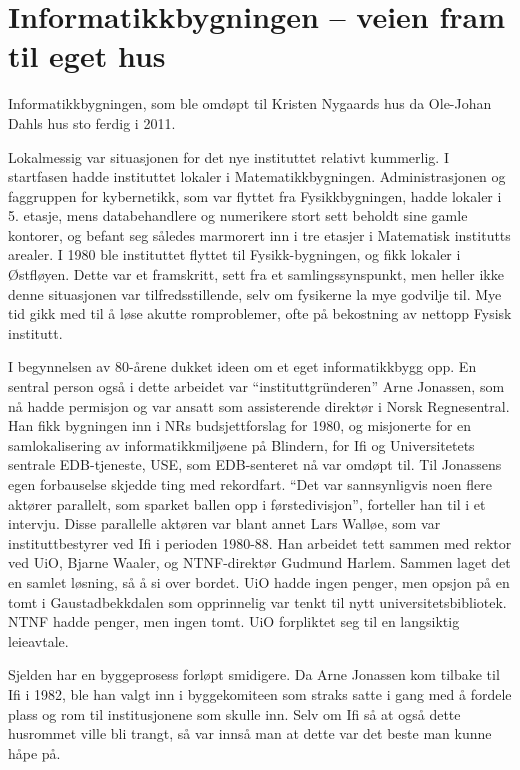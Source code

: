 \documentclass[../../main.tex]{subfiles}
\begin{document}
\chapter[Ifi 1]{Informatikkbygningen – veien fram til eget hus}


Informatikkbygningen, som ble omdøpt til Kristen Nygaards hus da Ole-Johan Dahls hus sto ferdig i 2011.

Lokalmessig var situasjonen for det nye instituttet relativt kummerlig. I startfasen hadde instituttet lokaler i Matematikkbygningen. Administrasjonen og faggruppen for kybernetikk, som var flyttet fra Fysikkbygningen, hadde lokaler i 5. etasje, mens databehandlere og numerikere stort sett beholdt sine gamle kontorer, og befant seg således marmorert inn i tre etasjer i Matematisk institutts arealer. I 1980 ble instituttet flyttet til Fysikk-bygningen, og fikk lokaler i Østfløyen. Dette var et framskritt, sett fra et samlingssynspunkt, men heller ikke denne situasjonen var tilfredsstillende, selv om fysikerne la mye godvilje til. Mye tid gikk med til å løse akutte romproblemer, ofte på bekostning av nettopp Fysisk institutt.

I begynnelsen av 80-årene dukket ideen om et eget informatikkbygg opp. En sentral person også i dette arbeidet var ``instituttgründeren'' Arne Jonassen, som nå hadde permisjon og var ansatt som assisterende direktør i Norsk Regnesentral. Han fikk bygningen inn i NRs budsjettforslag for 1980, og misjonerte for en samlokalisering av informatikkmiljøene på Blindern, for Ifi og Universitetets sentrale EDB-tjeneste, USE, som EDB-senteret nå var omdøpt til. Til Jonassens egen forbauselse skjedde ting med rekordfart. ``Det var sannsynligvis noen flere aktører parallelt, som sparket ballen opp i førstedivisjon'', forteller han til i et intervju. Disse parallelle aktøren var blant annet Lars Walløe, som var instituttbestyrer ved Ifi i perioden 1980-88. Han arbeidet tett sammen med rektor ved UiO, Bjarne Waaler, og NTNF-direktør Gudmund Harlem. Sammen laget det en samlet løsning, så å si over bordet. UiO hadde ingen penger, men opsjon på en tomt i Gaustadbekkdalen som opprinnelig var tenkt til nytt universitetsbibliotek. NTNF hadde penger, men ingen tomt. UiO forpliktet seg til en langsiktig leieavtale. 

Sjelden har en byggeprosess forløpt smidigere. Da Arne Jonassen kom tilbake til Ifi i 1982, ble han valgt inn i byggekomiteen som straks satte i gang med å fordele plass og rom til institusjonene som skulle inn. Selv om Ifi så at også dette husrommet ville bli trangt, så var innså man at dette var det beste man kunne håpe på.
\end{document}
